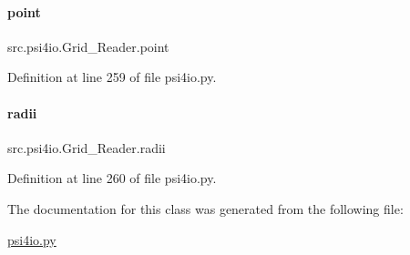 \paragraph{\texorpdfstring{point}{point}}
{\footnotesize\ttfamily src.\+psi4io.\+Grid\+\_\+\+Reader.\+point}



Definition at line 259 of file psi4io.\+py.

\mbox{\label{classsrc_1_1psi4io_1_1Grid__Reader_a6867b33c51d33ebc01aa6f1036ebf719}} 
\paragraph{\texorpdfstring{radii}{radii}}
{\footnotesize\ttfamily src.\+psi4io.\+Grid\+\_\+\+Reader.\+radii}



Definition at line 260 of file psi4io.\+py.



The documentation for this class was generated from the following file\+:\begin{DoxyCompactItemize}
\item 
\hyperlink{psi4io_8py}{psi4io.\+py}\end{DoxyCompactItemize}
